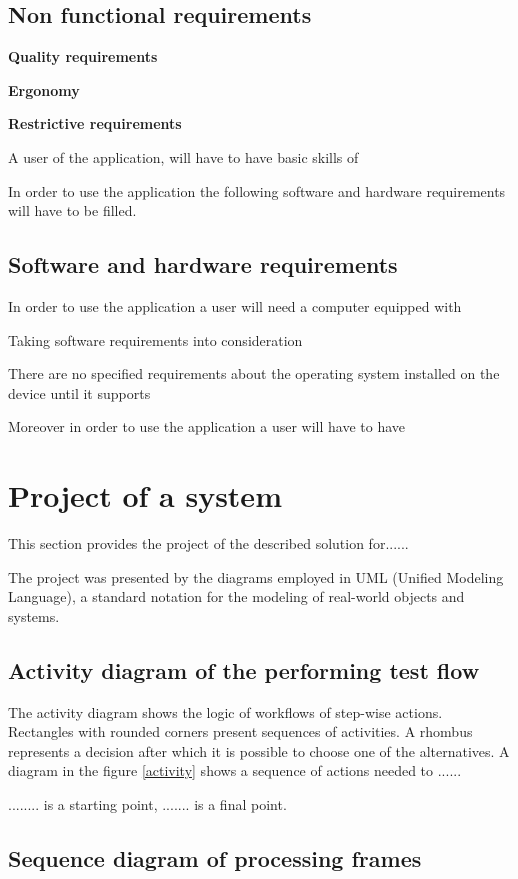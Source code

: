 \subsection{Non functional requirements}
\textbf{Quality requirements}


\textbf{Ergonomy}
\label{interfaceerg}


\textbf{Restrictive requirements}

A user of the application, will have to have basic skills of 


In order to use the application the following software and hardware requirements will have to be filled.

\subsection{Software and hardware requirements}
In order to use the application a user will need a computer equipped with 


 Taking software requirements into consideration 
 
 
There are no specified requirements about the operating system installed on the device until it supports 


 Moreover in order to use the application a user will have to have 
 
 
 
\section{Project of a system}
\label{project}
This section provides the project of the described solution for......

 The project was presented by the diagrams employed in UML (Unified Modeling Language), a standard notation for the modeling of real-world objects and systems. 
 
\subsection{Activity diagram of the performing test flow}
The activity diagram shows the logic of workflows of step-wise actions. Rectangles with rounded corners present sequences of activities. A rhombus represents a decision after which it is possible to choose one of the alternatives. A diagram in the figure \ref{activity} shows a sequence of actions needed to ......

........ is a starting point, ....... is a final point. 


\subsection{Sequence diagram of processing frames}




